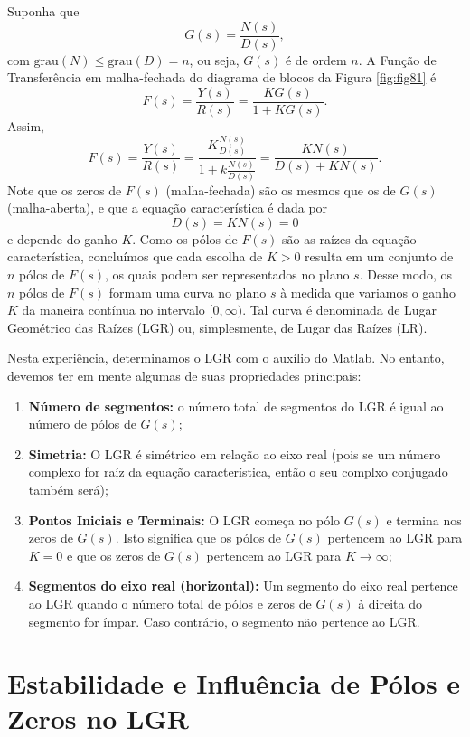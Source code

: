 \documentclass[
]{book}
\providecommand{\tightlist}{%
  \setlength{\itemsep}{0pt}\setlength{\parskip}{0pt}}
\theoremstyle{definition}
\theoremstyle{definition}
\theoremstyle{definition}
\theoremstyle{remark}
\begin{document}
Suponha que
\[
G(s) = \frac{N(s)}{D(s)},
\]
com \(\text{grau}(N) \leq \text{grau}(D) = n\), ou seja, \(G(s)\) é de ordem \(n\). A Função de Transferência em malha-fechada do diagrama de blocos da Figura \ref{fig:fig81} é
\[
F(s) = \frac{Y(s)}{R(s)} = \frac{KG(s)}{1 + KG(s)}.
\]
Assim,
\[
F(s) = \frac{Y(s)}{R(s)} = \frac{K\frac{N(s)}{D(s)}}{1+k\frac{N(s)}{D(s)}} = \frac{KN(s)}{D(s) + KN(s)}.
\]
Note que os zeros de \(F(s)\) (malha-fechada) são os mesmos que os de \(G(s)\) (malha-aberta), e que a equação característica é dada por
\[
D(s) = KN(s) = 0
\]
e depende do ganho \(K\). Como os pólos de \(F(s)\) são as raízes da equação característica, concluímos que cada escolha de \(K>0\) resulta em um conjunto de \(n\) pólos de \(F(s)\), os quais podem ser representados no plano \(s\). Desse modo, os \(n\) pólos de \(F(s)\) formam uma curva no plano \(s\) à medida que variamos o ganho \(K\) da maneira contínua no intervalo \([0,\infty)\). Tal curva é denominada de Lugar Geométrico das Raízes (LGR) ou, simplesmente, de Lugar das Raízes (LR).

Nesta experiência, determinamos o LGR com o auxílio do Matlab. No entanto, devemos ter em mente algumas de suas propriedades principais:

\begin{enumerate}
\def\labelenumi{\arabic{enumi}.}
\tightlist
\item
  \textbf{Número de segmentos:} o número total de segmentos do LGR é igual ao número de pólos de \(G(s)\);
\item
  \textbf{Simetria:} O LGR é simétrico em relação ao eixo real (pois se um número complexo for raíz da equação característica, então o seu complxo conjugado também será);
\item
  \textbf{Pontos Iniciais e Terminais:} O LGR começa no pólo \(G(s)\) e termina nos zeros de \(G(s)\). Isto significa que os pólos de \(G(s)\) pertencem ao LGR para \(K=0\) e que os zeros de \(G(s)\) pertencem ao LGR para \(K\to\infty\);
\item
  \textbf{Segmentos do eixo real (horizontal):} Um segmento do eixo real pertence ao LGR quando o número total de pólos e zeros de \(G(s)\) à direita do segmento for ímpar. Caso contrário, o segmento não pertence ao LGR.
\end{enumerate}

\hypertarget{estabilidade-e-influuxeancia-de-puxf3los-e-zeros-no-lgr}{%
\section{Estabilidade e Influência de Pólos e Zeros no LGR}\label{estabilidade-e-influuxeancia-de-puxf3los-e-zeros-no-lgr}}
\end{document}
